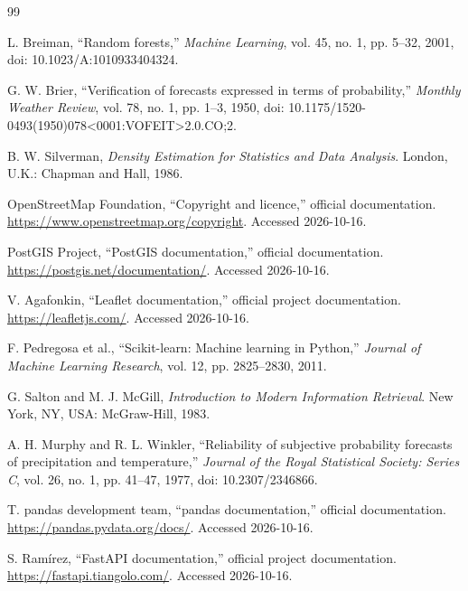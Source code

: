 \documentclass[11pt]{article}
\begin{document}
\begin{thebibliography}{99}

L. Breiman, ``Random forests,'' \emph{Machine Learning}, vol. 45, no. 1,
pp. 5--32, 2001, doi: 10.1023/A:1010933404324.

G. W. Brier, ``Verification of forecasts expressed in terms of
probability,'' \emph{Monthly Weather Review}, vol. 78, no. 1, pp. 1--3,
1950, doi: 10.1175/1520-0493(1950)078<0001:VOFEIT>2.0.CO;2.

B. W. Silverman, \emph{Density Estimation for Statistics and Data Analysis}.
London, U.K.: Chapman and Hall, 1986.

OpenStreetMap Foundation, ``Copyright and licence,'' official documentation.
\url{https://www.openstreetmap.org/copyright}. Accessed 2026-10-16.

PostGIS Project, ``PostGIS documentation,'' official documentation.
\url{https://postgis.net/documentation/}. Accessed 2026-10-16.

V. Agafonkin, ``Leaflet documentation,'' official project documentation.
\url{https://leafletjs.com/}. Accessed 2026-10-16.

F. Pedregosa et al., ``Scikit-learn: Machine learning in Python,''
\emph{Journal of Machine Learning Research}, vol. 12, pp. 2825--2830,
2011.

G. Salton and M. J. McGill, \emph{Introduction to Modern Information
Retrieval}. New York, NY, USA: McGraw-Hill, 1983.

A. H. Murphy and R. L. Winkler, ``Reliability of subjective probability
forecasts of precipitation and temperature,'' \emph{Journal of the Royal
Statistical Society: Series C}, vol. 26, no. 1, pp. 41--47, 1977,
doi: 10.2307/2346866.

T. pandas development team, ``pandas documentation,'' official
documentation. \url{https://pandas.pydata.org/docs/}. Accessed 2026-10-16.

S. Ramírez, ``FastAPI documentation,'' official project documentation.
\url{https://fastapi.tiangolo.com/}. Accessed 2026-10-16.

\end{thebibliography}
\end{document}

